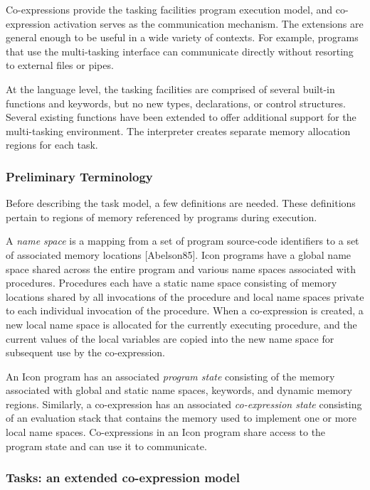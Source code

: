 Co-expressions provide the tasking facilities{\textquotesingle} program
execution model, and co-expression activation serves as the
communication mechanism. The extensions are general enough to be useful
in a wide variety of contexts. For example, programs that use the
multi-tasking interface can communicate directly without resorting to
external files or pipes.

At the language level, the tasking facilities are comprised of several
built-in functions and keywords, but no new types, declarations, or
control structures. Several existing functions have been extended to
offer additional support for the multi-tasking environment. The
interpreter creates separate memory allocation regions for each task. 

\subsubsection[Preliminary Terminology]{Preliminary Terminology}

Before describing the task model, a few definitions are needed. These
definitions pertain to regions of memory referenced by programs during
execution. 

A \textit{name space} is a mapping from a set of program source-code
identifiers to a set of associated memory locations [Abelson85]. Icon
programs have a global name space shared across the entire program and
various name spaces associated with procedures. Procedures each have a
static name space consisting of memory locations shared by all
invocations of the procedure and local name spaces private to each
individual invocation of the procedure.\newline
\newline
When a co-expression is created, a new local name space is allocated for
the currently executing procedure, and the current values of the local
variables are copied into the new name space for subsequent use by the
co-expression. 

An Icon program has an associated \textit{program state} consisting of
the memory associated with global and static name spaces, keywords, and
dynamic memory regions. Similarly, a co-expression has an associated
\textit{co-expression state} consisting of an evaluation stack that
contains the memory used to implement one or more local name spaces.
Co-expressions in an Icon program share access to the program state and
can use it to communicate. 

\subsubsection{Tasks: an extended co-expression model}

